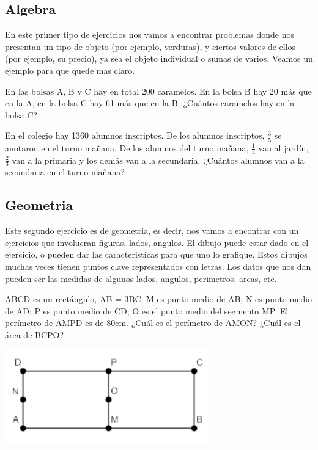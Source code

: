 \documentclass{article}
\begin{document}
\subsection{Algebra}
\begin{small}
En este primer tipo de ejercicios nos vamos a encontrar problemas donde nos presentan un tipo de objeto (por ejemplo, verduras), y ciertos valores de ellos (por ejemplo, su precio), ya sea el objeto individual o sumas de varios. Veamos un ejemplo para que quede mas claro.
\\
\end{small}

\begin{ejemplo}
En las bolsas A, B y C hay en total 200 caramelos. En la bolsa B hay 20 más que
en la A, en la bolsa C hay 61 más que en la B. ¿Cuántos caramelos hay en la bolsa C?
\end{ejemplo}

\begin{ejemplo}
En el colegio hay 1360 alumnos inscriptos. De los alumnos inscriptos, $\frac{3}{5}$ se anotaron en el turno mañana. De los alumnos del turno mañana, $\frac{1}{4}$ van al jardín, $\frac{2}{3}$ van a la primaria y los demás van a la secundaria. ¿Cuántos alumnos van a la secundaria en el turno mañana?
\end{ejemplo}

\subsection{Geometria}
\begin{small}
Este segundo ejercicio es de geometria, es decir, nos vamos a encontrar con un ejercicios que involucran figuras, lados, angulos.
El dibujo puede estar dado en el ejercicio, o pueden dar las caracteristicas para que uno lo grafique. Estos dibujos muchas veces tienen puntos clave representados con letras.
Los datos que nos dan pueden ser las medidas de algunos lados, angulos, perimetros, areas, etc.
\\
\end{small}

\begin{ejemplo}
ABCD es un rectángulo,
AB = 3BC;
M es punto medio de AB;
N es punto medio de AD;
P es punto medio de CD;
O es el punto medio del segmento MP.
El perímetro de AMPD es de 80cm.
¿Cuál es el perímetro de AMON?
¿Cuál es el área de BCPO?

\includegraphics[scale=0.6]{geometry-example-1}
\end{ejemplo}
\end{document}
